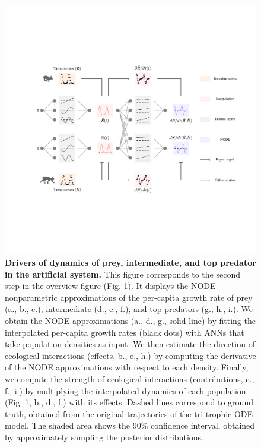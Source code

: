 \documentclass[11pt, oneside]{article}
\begin{document}
\newpage
\begin{figure}[H]
\begin{center}
\includegraphics[width=\linewidth,page=3]{figures/main.pdf}
\caption{
    \textbf{Drivers of dynamics of prey, intermediate, and top predator in the artificial system.}
    This figure corresponds to the second step in the overview figure (Fig. 1).
    It displays the NODE nonparametric approximations of the per-capita growth rate of prey (a., b., c.), intermediate (d., e., f.), and top predators (g., h., i.).
    We obtain the NODE approximations (a., d., g., solid line) by fitting the interpolated per-capita growth rates (black dots) with ANNs that take population densities as input.
    We then estimate the direction of ecological interactions (effects, b., e., h.) by computing the derivative of the NODE approximations with respect to each density.
    Finally, we compute the strength of ecological interactions (contributions, c., f., i.) by multiplying the interpolated dynamics of each population (Fig. 1, b., d., f.) with its effects.
    Dashed lines correspond to ground truth, obtained from the original trajectories of the tri-trophic ODE model. 
    The shaded area shows the 90\% confidence interval, obtained by approximately sampling the posterior distributions. 
}
\end{center}
\end{figure}
\newpage
\end{document}
